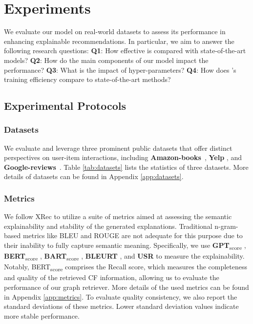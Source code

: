\section{Experiments}



We evaluate our model on real-world datasets to assess its performance in enhancing explainable recommendations. In particular, we aim to answer the following research questions: \textbf{Q1}: How effective is \model compared with state-of-the-art models? \textbf{Q2}: How do the main components of our model impact the performance? \textbf{Q3}: What is the impact of hyper-parameters? \textbf{Q4}: How does \model's training efficiency compare to state-of-the-art methods?  



\subsection{Experimental Protocols}

\subsubsection{Datasets} We evaluate \model and leverage three prominent public datasets that offer distinct perspectives on user-item interactions, including \textbf{Amazon-books}~\cite{ni2019justifying}, \textbf{Yelp} \cite{ma2024xrec}, and \textbf{Google-reviews}~\cite{li2022uctopic,yan2023personalized}. Table \ref{tab:datasets} lists the statistics of three datasets. More details of datasets can be found in Appendix \ref{app:datasets}.


\subsubsection{Metrics} We follow XRec \cite{ma2024xrec} to utilize a suite of metrics aimed at assessing the semantic explainability and stability of the generated explanations. Traditional n-gram-based metrics like BLEU \cite{papineni2002bleu} and ROUGE \cite{lin2004rouge} are not adequate for this purpose due to their inability to fully capture semantic meaning. Specifically, we use \textbf{GPT}\textsubscript{score} \cite{wang2023chatgpt}, \textbf{BERT}\textsubscript{score} \cite{zhang2019bertscore}, \textbf{BART}\textsubscript{score} \cite{yuan2021bartscore}, \textbf{BLEURT} \cite{sellam2020bleurt}, and \textbf{USR} \cite{li2021personalized} to measure the explainability. Notably, BERT\textsubscript{score} comprises the Recall score, which measures the completeness and quality of the retrieved CF information, allowing us to evaluate the performance of our graph retriever. More details of the used metrics can be found in Appendix \ref{app:metrics}. To evaluate quality consistency, we also report the standard deviations of these metrics. Lower standard deviation values indicate more stable performance.


